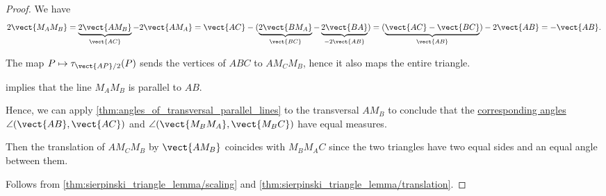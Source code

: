 \begin{proof}
   We have
  \begin{equation*}
    2\vect{M_A M_B}
    =
    \underbrace{2\vect{A M_B}}_{\vect{AC}} - 2\vect{A M_A}
    =
    \vect{AC} - (\underbrace{2\vect{B M_A}}_{\vect{BC}} - \underbrace{2\vect{BA}}_{-2\vect{AB}})
    =
    (\underbrace{\vect{AC} - \vect{BC}}_{\vect{AB}}) - 2\vect{AB}
    =
    -\vect{AB}.
  \end{equation*}

   The map \( P \mapsto \tau_{\vect{AP} / 2}(P) \) sends the vertices of \( ABC \) to \( A M_C M_B \), hence it also maps the entire triangle.

    implies that the line \( M_A M_B \) is parallel to \( A B \).

  Hence, we can apply \cref{thm:angles_of_transversal_parallel_lines} to the transversal \( A M_B \) to conclude that the \hyperref[def:angles_of_transversal/corresponding]{corresponding angles} \( \angle(\vect{AB}, \vect{AC}) \) and \( \angle(\vect{M_B M_A}, \vect{M_B C}) \) have equal measures.

  Then the translation of \( A M_C M_B \) by \( \vect{A M_B} \) coincides with \( M_B M_A C \) since the two triangles have two equal sides and an equal angle between them.

   Follows from \cref{thm:sierpinski_triangle_lemma/scaling} and \cref{thm:sierpinski_triangle_lemma/translation}.
\end{proof}

